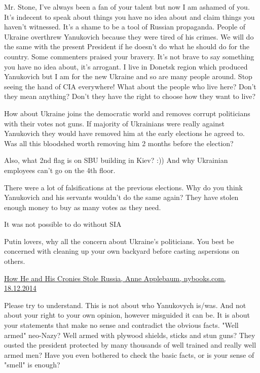 \begin{itemize}

Mr. Stone, I've always been a fan of your talent but now I am ashamed of you.
It's indecent to speak about things you have no idea about and claim things you
haven't witnessed. It's a shame to be a tool of Russian propaganda. People of
Ukraine overthrew Yanukovich because they were tired of his crimes. We will do
the same with the present President if he doesn't do what he should do for the
country. Some commenters praised your bravery. It's not brave to say something
you have no idea about, it's arrogant. I live in Donetsk region which produced
Yanukovich but I am for the new Ukraine and so are many people around. Stop
seeing the hand of CIA everywhere! What about the people who live here? Don't
they mean anything? Don't they have the right to choose how they want to live?

\begin{itemize} %

How about Ukraine joins the democratic world and removes corrupt politicians
with their votes not guns. If majority of Ukrainians were really against
Yanukovich they would have removed him at the early elections he agreed to. Was
all this bloodshed worth removing him 2 months before the election?

Also, what 2nd flag is on SBU building in Kiev? :))
And why Ukrainian employees can't go on the 4th floor.


There were a lot of falsifications at the previous elections. Why do you think
Yanukovich and his servants wouldn't do the same again? They have stolen enough
money to buy as many votes as they need.

It was not possible to do without SIA


Putin lovers, why all the concern about Ukraine's politicians. You best be
concerned with cleaning up your own backyard before casting aspersions on
others.

\href{https://www.nybooks.com/articles/2014/12/18/how-he-and-his-cronies-stole-russia/}{%
How He and His Cronies Stole Russia, Anne Applebaum, nybooks.com, 18.12.2014%
}

\end{itemize} %


Please try to understand. This is not about who Yanukovych is/was. And not
about your right to your own opinion, however misguided it can be. It is about
your statements that make no sense and contradict the obvious facts. "Well
armed" neo-Nazy? Well armed with plywood shields, sticks and stun guns? They
ousted the president protected by many thousands of well trained and really
well armed men? Have you even bothered to check the basic facts, or is your
sense of "smell" is enough?


\end{itemize}

